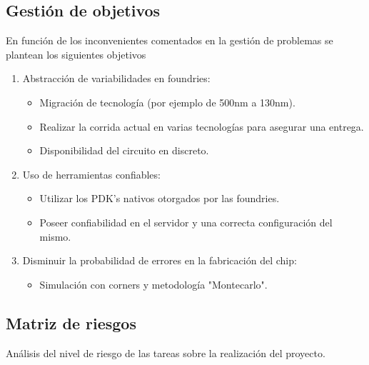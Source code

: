 \newpage

\subsection{Gestión de objetivos}
\label{sec:objetivos}
En función de los inconvenientes comentados en la gestión de problemas se plantean los siguientes objetivos
\begin{enumerate}
\item Abstracción de variabilidades en foundries:
	\begin{itemize}
    	\item Migración de tecnología (por ejemplo de 500nm a 130nm).
		\item Realizar la corrida actual en varias tecnologías para asegurar una entrega.
		\item Disponibilidad del circuito en discreto.
	\end{itemize}
\item Uso de herramientas confiables:
    \begin{itemize}
    	\item Utilizar los PDK's nativos otorgados por las foundries.
		\item Poseer confiabilidad en el servidor y una correcta configuración del mismo.
    \end{itemize}
\item Disminuir la probabilidad de errores en la fabricación del chip:
	\begin{itemize}
        \item Simulación con corners y metodología "Montecarlo". 
	\end{itemize}
\end{enumerate}

\subsection{Matriz de riesgos}
\label{sec:riesgos}
Análisis del nivel de riesgo de las tareas sobre la realización del proyecto.


